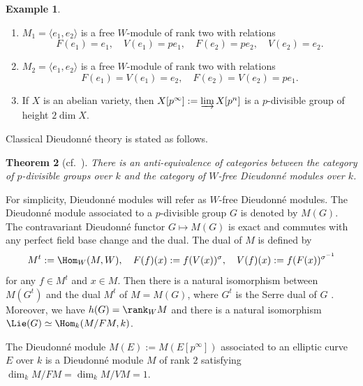 \documentclass[]{amsart}
\theoremstyle{plain}
\newtheorem{thm}{Theorem}
\theoremstyle{definition}
\newtheorem{eg}[thm]{Example}
\theoremstyle{remark}
\newcommand{\<}{\langle}   %
\renewcommand{\>}{\rangle} %
\newcommand{\dieu}{Dieudonn\'{e} }
\begin{document}
\begin{eg}\label{eg:2} \ 

\begin{enumerate}
    \item $M_1=\<e_1,e_2\>$ is a free $W$-module of rank two with relations 
\[ F(e_1)=e_1, \quad V(e_1)=pe_1, \quad F(e_2)=p e_2, \quad V(e_2)=e_2. \]
 \item $M_2=\<e_1,e_2\>$ is a free $W$-module of rank two with relations 
\[ F(e_1)=V(e_1)=e_2, \quad F(e_2)=V(e_2)=pe_1. \]
 \item If $X$ is an abelian variety, then $X[p^\infty]:=\varinjlim X[p^n]$ is a $p$-divisible group of height $2 \dim X$.\\  
\end{enumerate}
\end{eg}
    





Classical \dieu theory is stated as follows.

\begin{thm}[{cf.~\cite[p.~69--70]{demazure}}]\label{thm:dieu}
    There is an
anti-equivalence of categories between the category of $p$-divisible
groups over $k$ and the category of $W$-free \dieu modules over $k$. 
\end{thm}

For simplicity, \dieu modules will refer as 
$W$-free \dieu modules. The \dieu module associated to a $p$-divisible group $G$ is denoted by $M(G)$. 
The contravariant \dieu functor $G\mapsto M(G)$ is exact and commutes with any perfect field base change and the dual. The dual of $M$ is defined by 
\[ M^t:=\Hom_{W}(M,W), \quad F(f)(x):=f(V (x))^\sigma, \quad V(f)(x):=f(F(x))^{\sigma^{-1}}\]
for any $f\in M^t$ and $x\in M$. Then there is a natural isomorphism between $M(G^t)$ and the dual $M^t$ of $M=M(G)$, where $G^t$ is the Serre dual of $G$ \cite[Sect.~1.4]{li-oort}.
Moreover, we have $h(G)=\rank_W M$ and there is a natural isomorphism $\Lie(G)\simeq \Hom_k(M/FM, k)$.

The \dieu module $M(E):=M(E[p^\infty])$ associated to an elliptic curve $E$ over $k$ is a \dieu module $M$ of rank $2$ satisfying $\dim_k M/F M=\dim_k M/V M=1$.
\end{document}
